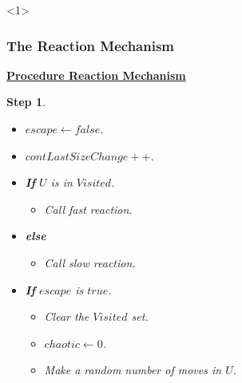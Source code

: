 \documentclass{beamer}
\newtheorem{step}{Step}
\begin{document}
\begin{frame}<1>
  \frametitle{The Reaction Mechanism}

{ \footnotesize

\begin{block}

\underline{\bf Procedure Reaction Mechanism}

\begin{step} 

\begin{itemize}
\item[-] $escape \leftarrow false$.
\item[-] $contLastSizeChange++$.
\item[-] \textbf{If} $U$ is in $Visited$.
    \begin{itemize} \item Call fast reaction. \end{itemize}
\item[-] \textbf{else}
    \begin{itemize} \item Call slow reaction. \end{itemize}
\item[-] \textbf{If} $escape$ is $true$.
    \begin{itemize}
    \item[-] Clear the $Visited$ set.
    \item[-] $chaotic \leftarrow 0$.
    \item[-] Make a random number of moves in $U$.
    \end{itemize}
\end{itemize}

\end{step}

\end{block}
}

\end{frame}
\end{document}
